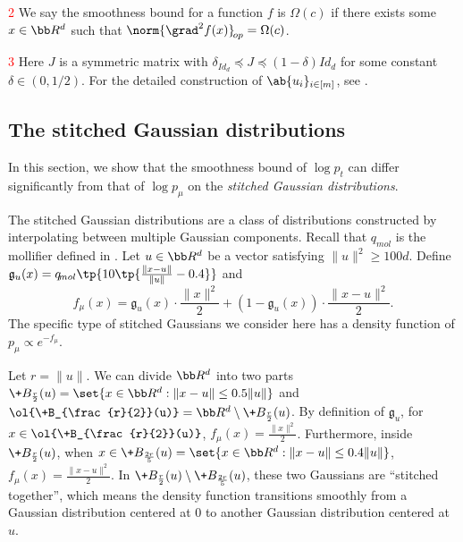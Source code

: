 \begin{table*}[htbp]
\begin{threeparttable}
\begin{tablenotes}
    \item[\textcolor{red}{2}] We say the smoothness bound for a function $f$ is $\Omega(c)$ if there exists some $x\in \bb R^d$ such that $\norm{\grad^2 f(x)}_{\!{op}} = \Omega(c)$.
	\item[\textcolor{red}{3}] Here $J$ is a symmetric matrix with $\delta_{\!{Id}_d}\preceq J \preceq (1-\delta)\!{Id}_d$ for some constant $\delta\in (0,1/2)$. For the detailed construction of $\ab\{u_i\}_{i\in[m]}$, see .
  \end{tablenotes}
\end{threeparttable}
\end{table*}

\subsection{The stitched Gaussian distributions}\label{subsec:stitched}

In this section,  we show that the smoothness bound of $\log p_t$ can differ significantly from that of $\log p_{\mu}$ on the \emph{stitched Gaussian distributions}.

The stitched Gaussian distributions are a class of distributions constructed by interpolating between multiple Gaussian components. Recall that $q_{\!{mol}}$ is the mollifier defined in . Let $u\in \bb R^d$ be a vector satisfying $\|u\|^2 \geq 100 d$. Define $\mathfrak{g}_{u}(x) = q_{\!{mol}}\tp{10\tp{\frac{\|x-u\|}{\|u\|} - 0.4}}$ and 
\[
    f_{\mu}(x) = \mathfrak{g}_{u}(x)\cdot \frac{\|x\|^2}{2} + (1-\mathfrak{g}_{u}(x))\cdot \frac{\|x-u\|^2}{2}.
\]  
The specific type of stitched Gaussians we consider here has a density function of $p_{\mu}\propto e^{-f_{\mu}}$.

Let $r=\|u\|$. We can divide $\bb R^d$ into two parts $\+B_{\frac{r}{2}}(u) = \set{x\in \bb R^d: \| x - u\| \leq 0.5 \|u\|}$ and $\ol{\+B_{\frac{r}{2}}(u)} = \bb R^d \setminus \+B_{\frac{r}{2}}(u)$. By definition of $\mathfrak{g}_{u}$, for $x\in \ol{\+B_{\frac{r}{2}}(u)}$, $f_{\mu}(x) = \frac{\|x\|^2}{2}$. Furthermore, inside $\+B_{\frac{r}{2}}(u)$, when $x\in \+B_{\frac{2r}{5}}(u) =\set{x\in \bb R^d: \| x - u\| \leq 0.4 \|u\|}$, $f_{\mu}(x) = \frac{\|x-u\|^2}{2}$. In $\+B_{\frac{r}{2}}(u)\setminus \+B_{\frac{2r}{5}}(u)$, these two Gaussians are ``stitched together'', which means the density function transitions smoothly from a Gaussian distribution centered at $0$ to another Gaussian distribution centered at $u$.

